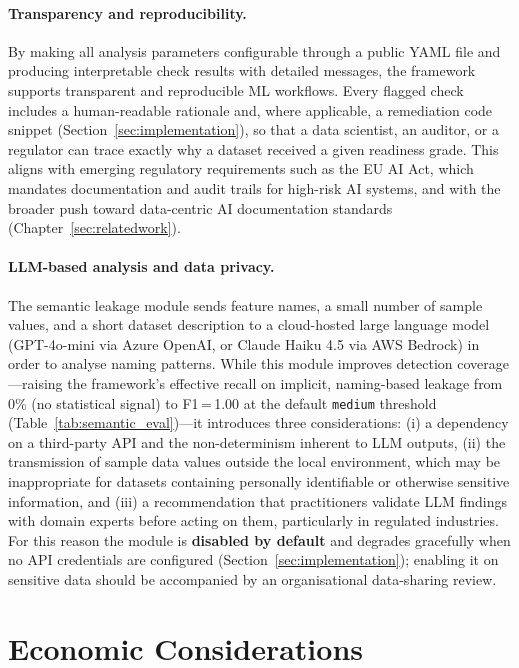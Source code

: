 \documentclass[12pt,a4paper]{report}
\begin{document}
\paragraph{Transparency and reproducibility.}  By making all analysis parameters configurable
through a public YAML file and producing interpretable check results with detailed messages,
the framework supports transparent and reproducible ML workflows.  Every flagged check
includes a human-readable rationale and, where applicable, a remediation code snippet
(Section~\ref{sec:implementation}), so that a data scientist, an auditor, or a regulator can
trace exactly why a dataset received a given readiness grade.  This aligns with emerging
regulatory requirements such as the EU AI Act, which mandates documentation and audit trails
for high-risk AI systems, and with the broader push toward data-centric AI documentation
standards (Chapter~\ref{sec:relatedwork}).

\paragraph{LLM-based analysis and data privacy.}  The semantic leakage module sends feature
names, a small number of sample values, and a short dataset description to a cloud-hosted
large language model (GPT-4o-mini via Azure OpenAI, or Claude Haiku 4.5 via AWS Bedrock)
in order to analyse naming patterns.
While this module improves detection coverage---raising the framework's effective recall on
implicit, naming-based leakage from 0\% (no statistical signal) to F1\,=\,1.00 at the
default \texttt{medium} threshold (Table~\ref{tab:semantic_eval})---it introduces three
considerations: (i) a dependency on a
third-party API and the non-determinism inherent to LLM outputs, (ii) the transmission of
sample data values outside the local environment, which may be inappropriate for datasets
containing personally identifiable or otherwise sensitive information, and (iii) a
recommendation that practitioners validate LLM findings with domain experts before acting on
them, particularly in regulated industries.  For this reason the module is \textbf{disabled
by default} and degrades gracefully when no API credentials are configured
(Section~\ref{sec:implementation}); enabling it on sensitive data should be accompanied by
an organisational data-sharing review.

\section{Economic Considerations}
\end{document}
